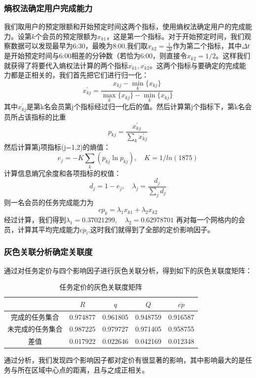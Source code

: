 \documentclass[withoutpreface,bwprint]{cumcmthesis} %
\begin{document}
\subsubsection{熵权法确定用户完成能力}

我们取用户的预定限额和开始预定时间这两个指标，使用熵权法确定用户的完成能力。设第$k$个会员的预定限额为$x_{k1}$，这是第一个指标。对于开始预定时间，我们观察数据可以发现最早为6:30，最晚为8:00,我们取$x_{k2}=\frac{1}{\Delta t}$作为第二个指标，其中$\Delta t$是开始预定时间与6:00相差的分钟数（若恰为6:00，则直接令$x_{k2}=1/2$。这样我们就获得了将要代入熵权法计算的两个指标$x_{k1},x_{k2}$。这两个指标与要确定的完成能力都是正相关的，我们首先把它们进行归一化：
$$x_{kj}^\prime=\frac{x_{kj}-\min_{k} \{x_{kj}\}}{\max_{k} \{x_{kj}\} - \min_{k} \{x_{kj}\}}$$
其中$x_{kj}^\prime$是第k名会员第j个指标经过归一化后的值。然后计算第j个指标下，第k名会员所占该指标的比重
$$p_{kj}=\frac{x_{kj}^\prime}{\sum_{k} x_{kj}^\prime}$$
然后计算第j项指标(j=1,2)的熵值：
$$e_j=-K\sum_{k} (p_{kj}\ln p_{kj}),\quad K=1/ln(1875)$$
计算信息熵冗余度和各项指标的权值：
$$d_j=1-e_j,\quad \lambda_j=\frac{d_j}{\sum_j d_j}$$
则一名会员的任务完成能力为
$$cp_k=\lambda_1x_{k1}+\lambda_2x_{k2}$$
经过计算，我们得到$\lambda_1=0.37021299,\quad \lambda_2=0.62978701$
再对每一个网格内的会员，计算其平均完成能力$\overline{cp_i}$,这时我们就得到了全部的定价影响因子。

\subsubsection{灰色关联分析确定关联度}

通过对任务定价与四个影响因子进行灰色关联分析，得到如下的灰色关联度矩阵：
\begin{table}[H]
    \centering
    \caption{任务定价的灰色关联度矩阵}
    \label{tab:表}
    \begin{tabular}{|c|c|c|c|c|}
        \hline
                 & $R$      & $q$      & $Q$      & $\overline{cp}$ \\ \hline
        完成的任务集合  & 0.974877 & 0.961805 & 0.948759 & 0.916587        \\ \hline
        未完成的任务集合 & 0.987225 & 0.979727 & 0.971405 & 0.958755        \\ \hline
        差值       & 0.017922 & 0.022646 & 0.042169 & 0.012348        \\ \hline
        \end{tabular}
    \end{table}
通过分析，我们发现四个影响因子都对定价有很显著的影响，其中影响最大的是任务与所在区域中心点的距离，且与之成正相关。
\end{document}
